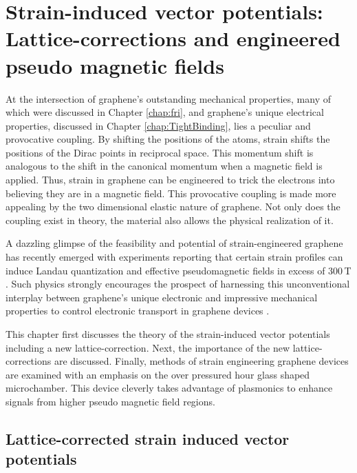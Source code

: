 \chapter{Strain-induced vector potentials: Lattice-corrections and engineered pseudo magnetic fields\label{chap:PVP}}

At the intersection of graphene's outstanding mechanical properties, many of which were discussed in Chapter \ref{chap:fri}, and graphene's unique electrical properties, discussed in Chapter \ref{chap:TightBinding}, lies a peculiar and provocative coupling.
By shifting the positions of the atoms, strain shifts the positions of the Dirac points in reciprocal space.
This momentum shift is analogous to the shift in the canonical momentum when a magnetic field is applied.
Thus, strain in graphene can be engineered to trick the electrons into believing they are in a magnetic field.
This provocative coupling is made more appealing by the two dimensional elastic nature of graphene.
Not only does the coupling exist in theory, the material also allows the physical realization of it.

A dazzling glimpse of the feasibility and potential of strain-engineered graphene \cite{Pereira2009a,Guinea2009} has recently emerged with experiments reporting that certain strain profiles can induce Landau quantization and effective pseudomagnetic fields in excess of 300\,T \cite{Levy2010,Yan2012,Yeh2011}.
Such physics strongly encourages the prospect of harnessing this unconventional interplay between graphene's unique electronic and impressive mechanical properties to control electronic transport in graphene devices \cite{Pereira2009a,Fogler2008}.

This chapter first discusses the theory of the strain-induced vector potentials including a new lattice-correction.  Next, the importance of the new lattice-corrections are discussed.
Finally, methods of strain engineering graphene devices are examined with an emphasis on the over pressured hour glass shaped microchamber.
This device cleverly takes advantage of plasmonics to enhance signals from higher pseudo magnetic field regions.

\section{Lattice-corrected strain induced vector potentials}

